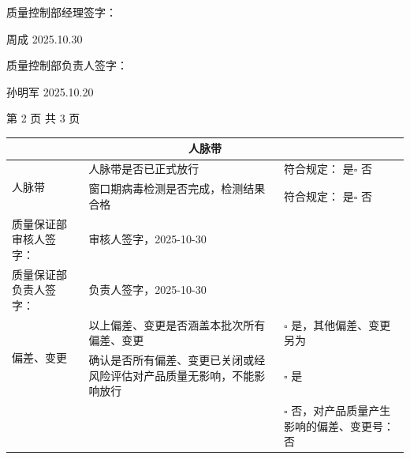 \documentclass[UTF8,10pt,a4paper,fontset=fandol]{ctexart}
\newcommand{\fieldvalue}[1]{#1}
\newcommand{\handwritten}[1]{#1}
\begin{document}
质量控制部经理签字：

\fieldvalue{\handwritten{周成 2025.10.30}}

\vspace{1em}

质量控制部负责人签字：

\fieldvalue{\handwritten{孙明军 2025.10.20}}

\begin{center}
第 2 页 共 3 页
\end{center}

\newpage

\begin{center}
\small
\begin{tabularx}{\textwidth}{|p{2.1cm}|X|p{3.4cm}|}
\hline
\multicolumn{3}{|c|}{人脉带} \\ \hline
\multirow{2}{*}{人脉带}
& 人脉带是否已正式放行
&
符合规定：
\fieldvalue{是}\quad $\square$ 否
\\ \cline{2-3}
& 窗口期病毒检测是否完成，检测结果合格
&
符合规定：
\fieldvalue{是}\quad $\square$ 否
\\ \hline

质量保证部审核人签字：
&
\fieldvalue{\handwritten{审核人签字，2025-10-30}}
& \\ \hline

质量保证部负责人签字：
&
\fieldvalue{\handwritten{负责人签字，2025-10-30}}
& \\ \hline

\multirow{2}{*}{偏差、变更}
& 以上偏差、变更是否涵盖本批次所有偏差、变更
&
$\square$ 是，其他偏差、变更另为
\\ \cline{2-3}
&
确认是否所有偏差、变更已关闭或经风险评估对产品质量无影响，不能影响放行
&
$\square$ 是\\
& & $\square$ 否，对产品质量产生影响的偏差、变更号：
\fieldvalue{否}
\\ \hline


\end{tabularx}
\end{center}
\end{document}
